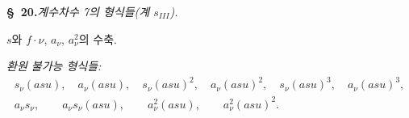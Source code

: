 
\begin{center}
\textbf{\S\ 20.}\quad\emph{계수차수 7의 형식들(계 $s_{III}$).}
\end{center}

$s$와 $f\cdot \nu$, $a_\nu$, $a_\nu^2$의 수축.

\noindent\emph{환원 불가능 형식들:}
\[
\begin{gathered}
s_\nu(asu),\quad a_\nu(asu),\quad s_\nu(asu)^2,\quad a_\nu(asu)^2,\quad
s_\nu(asu)^3,\quad a_\nu(asu)^3,\\
a_\nu s_\nu,\qquad a_\nu s_\nu(asu),\qquad a_\nu^2(asu),\qquad a_\nu^2(asu)^2.
\end{gathered}
\]
